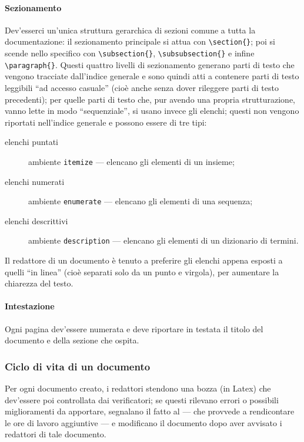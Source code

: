 			\paragraph{Sezionamento} 
				Dev'esserci un'unica struttura gerarchica di sezioni comune a tutta la documentazione: il sezionamento principale si attua con \texttt{\textbackslash section\{\}}; poi si scende nello specifico con \texttt{\textbackslash subsection\{\}}, \texttt{\textbackslash subsubsection\{\}} e infine \texttt{\textbackslash paragraph\{\}}. Questi quattro livelli di sezionamento generano parti di testo che vengono tracciate dall'indice generale e sono quindi atti a contenere parti di testo leggibili “ad accesso casuale” (cioè anche senza dover rileggere parti di testo precedenti); per quelle parti di testo che, pur avendo una propria strutturazione, vanno lette in modo “sequenziale”, si usano invece gli elenchi; questi non vengono riportati nell'indice generale e possono essere di tre tipi:
			\begin{description}
				\item[elenchi puntati] ambiente \texttt{itemize} --- elencano gli elementi di un insieme;
				\item[elenchi numerati] ambiente \texttt{enumerate} --- elencano gli elementi di una sequenza;
				\item[elenchi descrittivi] ambiente \texttt{description} --- elencano gli elementi di un dizionario di termini.
			\end{description}
			Il redattore di un documento è tenuto a preferire gli elenchi appena esposti a quelli “in linea” (cioè separati solo da un punto e virgola), per aumentare la chiarezza del testo.
			\paragraph{Intestazione} 
				Ogni pagina dev'essere numerata e deve riportare in testata il titolo del documento e della sezione che ospita. %
		
		\subsubsection{Ciclo di vita di un documento} 
			Per ogni documento creato, i redattori stendono una bozza (in Latex) che dev'essere poi controllata dai verificatori; se questi rilevano errori o possibili miglioramenti da apportare, segnalano il fatto al  --- che provvede a rendicontare le ore di lavoro aggiuntive --- e modificano il documento dopo aver avvisato i redattori di tale documento.
		

